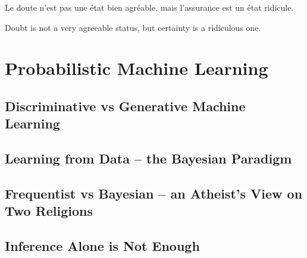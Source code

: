 
\begin{savequote}[8cm]
	\textlatin{Le doute n'est pas une état bien agréable, mais l'assurance est un état ridicule.}
	
	Doubt is not a very agreeable status, but certainty is a ridiculous one.
\end{savequote}


\chapter{Probabilistic Machine Learning}
\label{chp:bayes}


\section{Discriminative vs Generative Machine Learning}
\label{sec:bayes:discrim}



\section{Learning from Data -- the Bayesian Paradigm}
\label{sec:bayes:paradigm}



\section{Frequentist vs Bayesian -- an Atheist's View on Two Religions}
\label{sec:bayes:religions}

\section{Inference Alone is Not Enough}